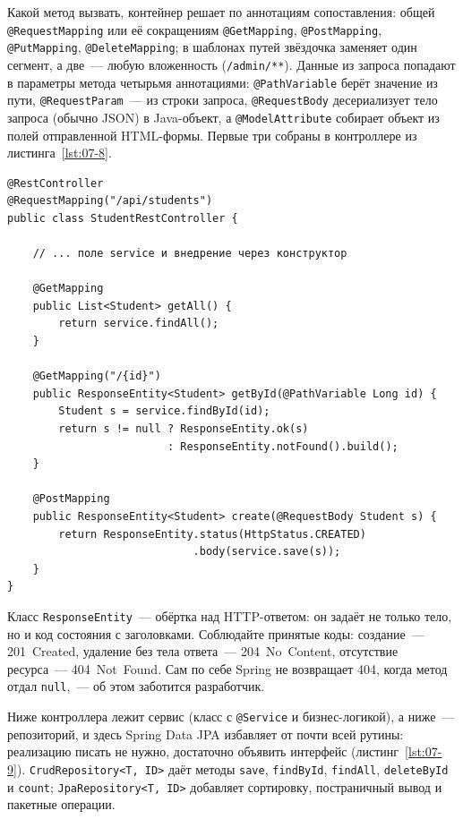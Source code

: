 Какой метод вызвать, контейнер решает по аннотациям сопоставления: общей
\texttt{@RequestMapping} или её сокращениям \texttt{@GetMapping},
\texttt{@PostMapping}, \texttt{@PutMapping}, \texttt{@DeleteMapping}; в
шаблонах путей звёздочка заменяет один сегмент, а две~--- любую вложенность
(\texttt{/admin/**}). Данные из запроса попадают в параметры метода четырьмя
аннотациями: \texttt{@PathVariable} берёт значение из пути,
\texttt{@RequestParam}~--- из строки запроса, \texttt{@RequestBody}
десериализует тело запроса (обычно JSON) в Java-объект, а
\texttt{@ModelAttribute} собирает объект из полей отправленной
HTML-формы. Первые три собраны в контроллере из
листинга~\ref{lst:07-8}.

\begin{listing}[H]
\begin{verbatim}
@RestController
@RequestMapping("/api/students")
public class StudentRestController {

    // ... поле service и внедрение через конструктор

    @GetMapping
    public List<Student> getAll() {
        return service.findAll();
    }

    @GetMapping("/{id}")
    public ResponseEntity<Student> getById(@PathVariable Long id) {
        Student s = service.findById(id);
        return s != null ? ResponseEntity.ok(s)
                         : ResponseEntity.notFound().build();
    }

    @PostMapping
    public ResponseEntity<Student> create(@RequestBody Student s) {
        return ResponseEntity.status(HttpStatus.CREATED)
                             .body(service.save(s));
    }
}
\end{verbatim}
\caption{REST-контроллер с операциями над сущностью}
\label{lst:07-8}
\end{listing}

Класс \texttt{ResponseEntity}~--- обёртка над HTTP-ответом: он задаёт не
только тело, но и код состояния с заголовками. Соблюдайте принятые коды:
создание~--- 201~Created, удаление без тела ответа~--- 204~No~Content,
отсутствие ресурса~--- 404~Not~Found. Сам по себе Spring не возвращает 404,
когда метод отдал \texttt{null},~--- об этом заботится разработчик.

Ниже контроллера лежит сервис (класс с \texttt{@Service} и бизнес-логикой), а
ниже~--- репозиторий, и здесь Spring Data JPA избавляет от почти всей рутины:
реализацию писать не нужно, достаточно объявить интерфейс
(листинг~\ref{lst:07-9}). \texttt{CrudRepository<T, ID>} даёт методы
\texttt{save}, \texttt{findById}, \texttt{findAll}, \texttt{deleteById} и
\texttt{count}; \texttt{JpaRepository<T, ID>} добавляет сортировку,
постраничный вывод и пакетные операции.


